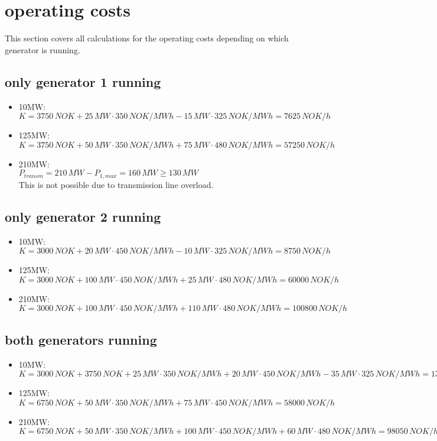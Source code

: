 \documentclass{article}
\begin{document}
	\section{operating costs}
		This section covers all calculations for the operating costs depending on which generator is running.
		\subsection{only generator 1 running}
			\begin{itemize}
				\item 10MW:\\
					$K=3750\,NOK+25\,MW\cdot 350\,NOK/MWh-15\,MW\cdot 325\,NOK/MWh=7625\,NOK/h$
				\item 125MW:\\
					$K=3750\,NOK+50\,MW\cdot 350\,NOK/MWh+75\,MW\cdot 480\,NOK/MWh=57250\,NOK/h$
				\item 210MW:\\
					$P_{transm}=210\,MW-P_{1,max}=160\,MW\geq 130\,MW$\\
					This is not possible due to transmission line overload.
			\end{itemize}

		\subsection{only generator 2 running}
			\begin{itemize}
				\item 10MW:\\
					$K=3000\,NOK+20\,MW\cdot 450\,NOK/MWh-10\,MW\cdot 325\,NOK/MWh=8750\,NOK/h$
				\item 125MW:\\
					$K=3000\,NOK+100\,MW\cdot 450\,NOK/MWh+25\,MW\cdot 480\,NOK/MWh=60000\,NOK/h$
				\item 210MW:\\
					$K=3000\,NOK+100\,MW\cdot 450\,NOK/MWh+110\,MW\cdot 480\,NOK/MWh=100800\,NOK/h$
			\end{itemize}

		\subsection{both generators running}
			\begin{itemize}
				\item 10MW:\\
					$K=3000\,NOK+3750\,NOK+25\,MW\cdot 350\,NOK/MWh+20\,MW\cdot 450\,NOK/MWh-35\,MW\cdot 325\,NOK/MWh=13125\,NOK/h$
				\item 125MW:\\
					$K=6750\,NOK+50\,MW\cdot 350\,NOK/MWh+75\,MW\cdot 450\,NOK/MWh=58000\,NOK/h$
				\item 210MW:\\
					$K=6750\,NOK+50\,MW\cdot 350\,NOK/MWh+100\,MW\cdot 450\,NOK/MWh+60\,MW\cdot 480\,NOK/MWh=98050\,NOK/h$
			\end{itemize}
\end{document}
